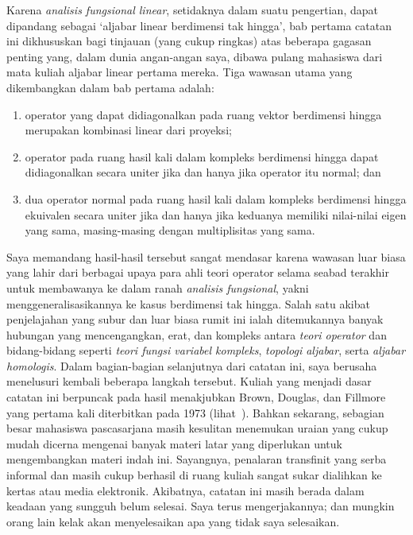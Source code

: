 Karena \emph{analisis fungsional linear}, setidaknya dalam suatu pengertian, dapat
dipandang sebagai `aljabar linear berdimensi tak hingga', bab pertama catatan ini
dikhususkan bagi tinjauan (yang cukup ringkas) atas beberapa gagasan penting yang,
  dalam dunia angan-angan saya, dibawa pulang mahasiswa dari mata kuliah
aljabar linear pertama mereka. Tiga wawasan utama yang dikembangkan dalam bab pertama
adalah:
\begin{enumerate}
  \item operator yang dapat didiagonalkan pada ruang vektor berdimensi hingga merupakan
  kombinasi linear dari proyeksi;
  \item operator pada ruang hasil kali dalam kompleks berdimensi hingga dapat didiagonalkan secara
  uniter jika dan hanya jika operator itu normal; dan
  \item dua operator normal pada ruang hasil kali dalam kompleks berdimensi hingga ekuivalen secara
  uniter jika dan hanya jika keduanya memiliki nilai-nilai eigen yang sama, masing-masing
  dengan multiplisitas yang sama. %
\end{enumerate}
Saya memandang hasil-hasil tersebut sangat mendasar karena wawasan luar biasa yang lahir
dari berbagai upaya para ahli teori operator selama seabad terakhir untuk membawanya ke
dalam ranah \emph{analisis fungsional}, yakni menggeneralisasikannya ke kasus berdimensi
tak hingga. Salah satu akibat penjelajahan yang subur dan luar biasa rumit ini ialah
ditemukannya banyak hubungan yang mencengangkan, erat, dan kompleks antara \emph{teori
operator} dan bidang-bidang seperti \emph{teori fungsi variabel kompleks}, \emph{topologi
aljabar}, serta \emph{aljabar homologis}. Dalam bagian-bagian selanjutnya dari catatan ini, saya
berusaha menelusuri kembali beberapa langkah tersebut. Kuliah yang menjadi dasar catatan
ini berpuncak pada hasil menakjubkan Brown, Douglas, dan Fillmore yang pertama kali
diterbitkan pada 1973 (lihat~\cite{BrownDF:1973}). Bahkan sekarang, sebagian besar mahasiswa
pascasarjana masih kesulitan menemukan uraian yang cukup mudah dicerna mengenai banyak
materi latar yang diperlukan untuk mengembangkan materi indah ini. Sayangnya, penalaran
transfinit yang serba informal dan masih cukup berhasil di ruang kuliah sangat sukar dialihkan ke kertas
atau media elektronik. Akibatnya, catatan ini masih berada dalam keadaan yang sungguh
belum selesai. Saya terus mengerjakannya; dan mungkin orang lain kelak akan menyelesaikan
apa yang tidak saya selesaikan.

